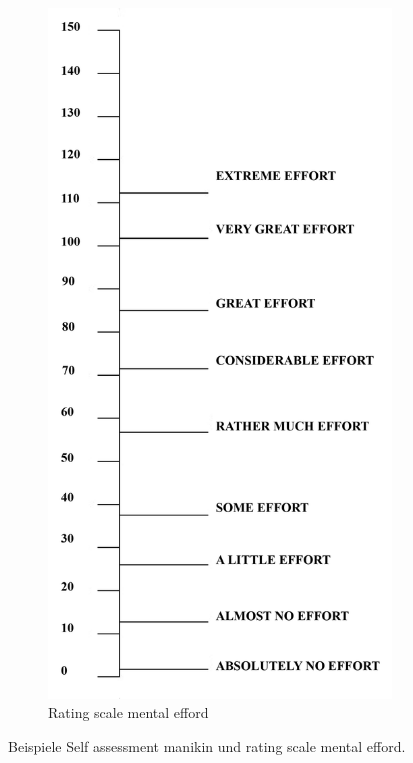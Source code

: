 \begin{figure}
\begin{subfigure}{0.25\textwidth}
		\includegraphics[width=\textwidth]{./images/rsme.png}
		\caption{Rating scale mental efford}
		\label{fig:rsme_questionnaire}
	\end{subfigure}
	\caption{Beispiele Self assessment manikin und rating scale mental efford.} %
\end{figure}

